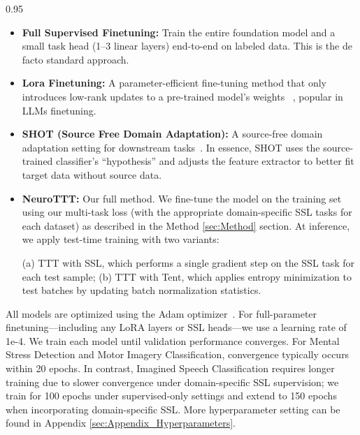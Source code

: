 \documentclass{article} %
\begin{document}
\begin{spacing}{0.95}
\begin{itemize}
    \item \textbf{Full Supervised Finetuning:} Train the entire foundation model and a small task head (1--3 linear layers) end-to-end on labeled data. This is the de facto standard approach.
    \item \textbf{Lora Finetuning:} A parameter-efficient fine-tuning method that only introduces low-rank updates to a pre-trained model’s weights~ \citep{hu2022lora}, popular in LLMs finetuning. 
    \item \textbf{SHOT (Source Free Domain Adaptation):} A source-free domain adaptation setting for downstream tasks~\citep{liang2020we}. In essence, SHOT uses the source-trained classifier’s “hypothesis” and adjusts the feature extractor to better fit target data without source data. 
    \item \textbf{NeuroTTT:} Our full method. We fine-tune the model on the training set using our multi-task loss (with the appropriate domain-specific SSL tasks for each dataset) as described in the Method \ref{sec:Method} section. At inference, we apply test-time training with two variants: 

    (a) TTT with SSL, which performs a single gradient step on the SSL task for each test sample; (b) TTT with Tent, which applies entropy minimization to test batches by updating batch normalization statistics.
\end{itemize}

All models are optimized using the Adam optimizer~\citep{kingma2014adam}. For full-parameter finetuning—including any LoRA layers or SSL heads—we use a learning rate of 1e-4. We train each model until validation performance converges. For Mental Stress Detection and Motor Imagery Classification, convergence typically occurs within 20 epochs. In contrast, Imagined Speech Classification requires longer training due to slower convergence under domain-specific SSL supervision; we train for 100 epochs under supervised-only settings and extend to 150 epochs when incorporating domain-specific SSL. More hyperparameter setting can be found in Appendix \ref{sec:Appendix_Hyperparameters}.
\end{spacing}


\end{document}
